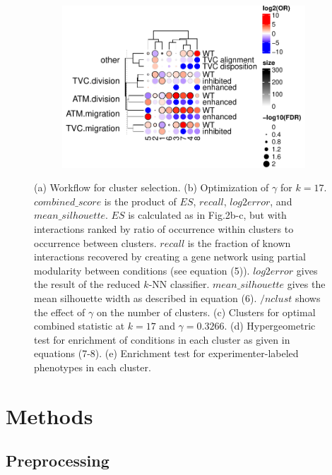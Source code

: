 \documentclass{article}
\begin{document}
\begin{figure}
\begin{subfigure}[b]{0.25\textwidth}
		\caption{}
		\label{}
	\end{subfigure}
	\hfill
	\begin{subfigure}[b]{0.37\textwidth}
		\includegraphics[width=\textwidth]{clust.pheno.pdf}
		\caption{}
		\label{}
	\end{subfigure}
	\caption{(a) Workflow for cluster selection. 
		(b) Optimization of $\gamma$ for $k = 17$. 
		$combined\_score$ is the product of $ES$, $recall$, $log2error$, and $mean\_silhouette$. 
		$ES$ is calculated as in Fig.2b-c, but with interactions ranked by ratio of occurrence within clusters to occurrence between clusters. 
		$recall$ is the fraction of known interactions recovered by creating a gene network using partial modularity between conditions (see equation (5)). 
		$log2error$ gives the result of the reduced $k$-NN classifier.
		$mean\_silhouette$ gives the mean silhouette width as described in equation (6).
		$/nclust$ shows the effect of $\gamma$ on the number of clusters.
	(c) Clusters for optimal combined statistic at $k = 17$ and $\gamma = 0.3266$.
(d) Hypergeometric test for enrichment of conditions in each cluster as given in equations (7-8). 
(e) Enrichment test for experimenter-labeled phenotypes in each cluster.}
	\label{}

\end{figure}

\section{Methods}

\subsection{Preprocessing}
\end{document}

